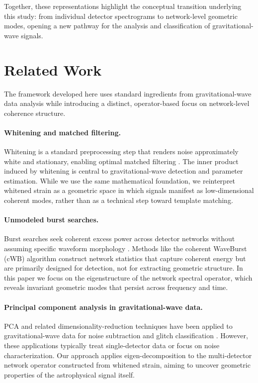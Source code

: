 \documentclass[11pt,a4paper]{article}
\begin{document}
Together, these representations highlight the conceptual transition underlying this study: from individual detector spectrograms to network-level geometric modes, opening a new pathway for the analysis and classification of gravitational-wave signals.

\section{Related Work}
\label{sec:related}

The framework developed here uses standard ingredients from gravitational-wave data analysis while introducing a distinct, operator-based focus on network-level coherence structure.

\paragraph{Whitening and matched filtering.}
Whitening is a standard preprocessing step that renders noise approximately white and stationary, enabling optimal matched filtering \cite{Creighton2011, Gabbard2018}. The inner product induced by whitening is central to gravitational-wave detection and parameter estimation. While we use the same mathematical foundation, we reinterpret whitened strain as a geometric space in which signals manifest as low-dimensional coherent modes, rather than as a technical step toward template matching.

\paragraph{Unmodeled burst searches.}
Burst searches seek coherent excess power across detector networks without assuming specific waveform morphology \cite{Klimenko2016, Sutton2010, Abbott2021BurstO3}. Methods like the coherent WaveBurst (cWB) algorithm construct network statistics that capture coherent energy but are primarily designed for detection, not for extracting geometric structure. In this paper we focus on the eigenstructure of the network spectral operator, which reveals invariant geometric modes that persist across frequency and time.

\paragraph{Principal component analysis in gravitational-wave data.}
PCA and related dimensionality-reduction techniques have been applied to gravitational-wave data for noise subtraction and glitch classification \cite{Cornish2015, Powell2021, Tolley2023ArchEnemy}. However, these applications typically treat single-detector data or focus on noise characterization. Our approach applies eigen-decomposition to the multi-detector network operator constructed from whitened strain, aiming to uncover geometric properties of the astrophysical signal itself.
\end{document}
